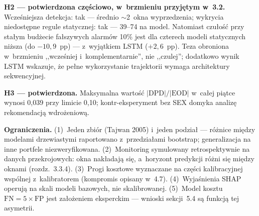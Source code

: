 \textbf{H2 --- potwierdzona częściowo, w~brzmieniu przyjętym w~3.2.}
Wcześniejsza detekcja: tak --- średnio $\sim$2~okna wyprzedzenia; wykrycia
niedostępne regule statycznej: tak --- 39--74 na model. Natomiast czułość przy
stałym budżecie fałszywych alarmów 10\% jest dla czterech modeli statycznych
niższa (do $-10{,}9$~pp) --- z~wyjątkiem LSTM ($+2{,}6$~pp). Teza obroniona
w~brzmieniu ,,wcześniej i~komplementarnie'', nie ,,czulej''; dodatkowo wynik
LSTM wskazuje, że pełne wykorzystanie trajektorii wymaga architektury
sekwencyjnej.

\textbf{H3 --- potwierdzona.} Maksymalna wartość $|\mathrm{DPD}|/|\mathrm{EOD}|$
w~całej piątce wynosi 0,039 przy limicie 0,10; kontr-eksperyment bez SEX domyka
analizę rekomendacją wdrożeniową.

\textbf{Ograniczenia.} (1)~Jeden zbiór (Tajwan 2005) i~jeden podział ---
różnice między modelami drzewiastymi raportowano z~przedziałami bootstrap;
generalizacja na inne portfele niezweryfikowana. (2)~Monitoring symulowany
retrospektywnie na danych przekrojowych: okna nakładają się, a~horyzont
predykcji różni się między oknami (rozdz.~3.3.4). (3)~Progi kosztowe wyznaczane
na części kalibracyjnej wspólnej z~kalibratorem (kompromis opisany w~4.7).
(4)~Wyjaśnienia SHAP operują na skali modeli bazowych, nie skalibrowanej.
(5)~Model kosztu $\mathrm{FN} = 5 \times \mathrm{FP}$ jest założeniem
eksperckim --- wnioski sekcji~5.4 są funkcją tej asymetrii.
